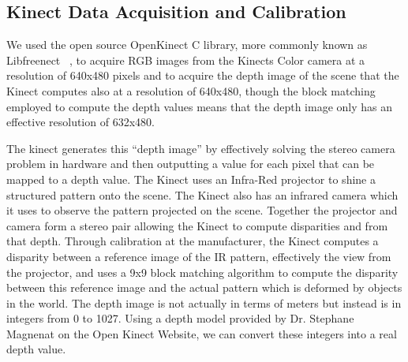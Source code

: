 \documentclass[letterpaper, 10pt, conference]{ieeeconf}
\begin{document}
\subsection{Kinect Data Acquisition and Calibration}
%
%
We used the open source OpenKinect C library, more commonly known as Libfreenect ~\cite{OpenKinect}, to acquire RGB images from the Kinects Color camera at a resolution of 640x480 pixels and to acquire the depth image of the scene that the Kinect computes also at a resolution of 640x480, though the block matching employed to compute the depth values means that the depth image only has an effective resolution of 632x480.

The kinect generates this “depth image” by effectively solving the stereo camera problem in hardware and then outputting a value for each pixel that can be mapped to a depth value.  The Kinect uses an Infra-Red projector to shine a structured pattern onto the scene.  The Kinect also has an infrared camera which it uses to observe the pattern projected on the scene.  Together the projector and camera form a stereo pair allowing the Kinect to compute disparities and from that depth.  Through calibration at the manufacturer, the Kinect computes a disparity between a reference image of the IR pattern, effectively the view from the projector, and uses a 9x9 block matching algorithm to compute the disparity between this reference image and the actual pattern which is deformed by objects in the world.  The depth image is not actually in terms of meters but instead is in integers from 0 to 1027.  Using a depth model provided by Dr. Stephane Magnenat on the Open Kinect Website, we can convert these integers into a real depth value.  
\end{document}
